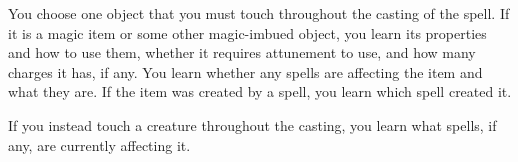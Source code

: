 {You choose one object that you must touch throughout the casting of the spell. If it is a magic item or some other magic-imbued object, you learn its properties and how to use them, whether it requires attunement to use, and how many charges it has, if any. You learn whether any spells are affecting the item and what they are. If the item was created by a spell, you learn which spell created it.

If you instead touch a creature throughout the casting, you learn what spells, if any, are currently affecting it.

%
%
%
%
%
%
%
%
%
%
}
